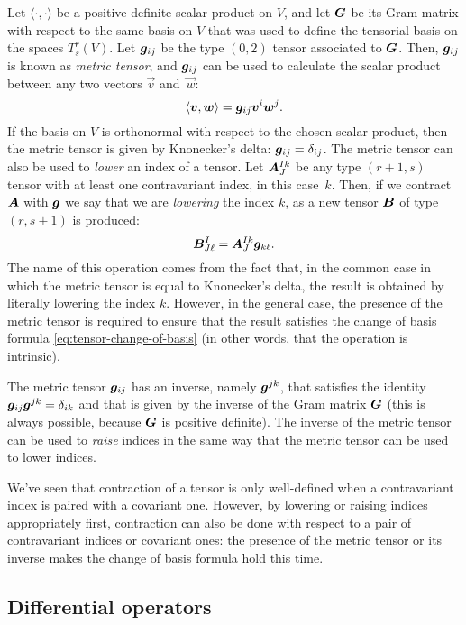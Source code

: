 Let $\langle \cdot, \cdot \rangle$ be a positive-definite scalar product
on $V$, and let $\bm{G}$ be its Gram matrix with respect to the same
basis on $V$ that was used to define the tensorial basis on the spaces $T^r_s(V)$.
Let $\bm{g}_{ij}$ be the type $(0,2)$ tensor associated to $\bm{G}$.
Then, $\bm{g}_{ij}$ is known as \emph{metric tensor}, and $\bm{g}_{ij}$
can be used to calculate the scalar product between any two vectors
$\vec{v}$ and~$\vec{w}$:
\[
\langle \bm{v}, \bm{w} \rangle = \bm{g}_{ij} \bm{v}^i \bm{w}^j.
\]
If the basis on $V$ is orthonormal with respect to the chosen scalar
product, then the metric tensor is given by Knonecker's delta:
$\bm{g}_{ij} = \delta_{ij}$. The metric tensor can also be used
to \emph{lower} an index of a tensor. Let $\bm{A}^{Ik}_J$ be
any type $(r+1,s)$ tensor with at least one contravariant index,
in this case~$k$. Then, if we contract $\bm{A}$ with $\bm{g}$ we
say that we are \emph{lowering} the index $k$, as a new tensor $\bm{B}$
of type $(r,s+1)$ is produced:
\[
\bm{B}^I_{J \ell} = \bm{A}^{Ik}_J \bm{g}_{k \ell}.
\]
The name of this operation comes from the fact that, in the common case in which
the metric tensor is equal to Knonecker's delta, the result is obtained by
literally lowering the index $k$. However, in the general case, the
presence of the metric tensor is required to ensure that the result
satisfies the change of basis formula \eqref{eq:tensor-change-of-basis}
(in other words, that the operation is intrinsic).

The metric tensor $\bm{g}_{ij}$ has an inverse, namely $\bm{g}^{jk}$,
that satisfies the identity $\bm{g}_{ij} \bm{g}^{jk} = \delta_{ik}$
and that is given by the inverse of the Gram matrix $\bm{G}$
(this is always possible, because $\bm{G}$ is positive definite).
The inverse of the metric tensor can be used to \emph{raise} indices
in the same way that the metric tensor can be used to lower indices.

We've seen that contraction of a tensor is only well-defined when
a contravariant index is paired with a covariant one.
However, by lowering or raising indices appropriately first, contraction
can also be done with respect to a pair of contravariant indices
or covariant ones: the presence of the metric tensor or its inverse
makes the change of basis formula hold this time.

\subsection*{Differential operators}

